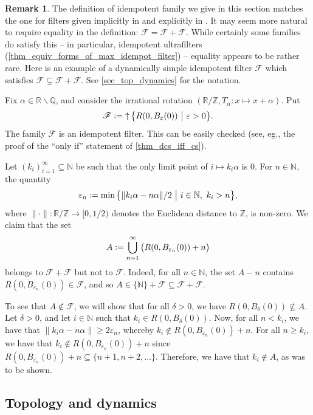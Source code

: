 \documentclass[letter,11pt]{article}
\theoremstyle{plain}
\theoremstyle{definition}
\newtheorem{remark}[theorem]{Remark}
\theoremstyle{plain}
\theoremstyle{plain}
\numberwithin{equation}{section}
\newcommand{\eps}{\epsilon}
\newcommand{\N}{\mathbb{N}}
\newcommand{\Z}{\mathbb{Z}}
\newcommand{\R}{\mathbb{R}}
\newcommand{\Q}{\mathbb{Q}}
\newcommand{\defeq}{\vcentcolon=}
\renewcommand{\epsilon}{\varepsilon}
\renewcommand{\geq}{\geqslant}
\renewcommand{\setminus}{\backslash}
\DeclareMathOperator{\upclose}{\uparrow}
\newcommand{\filter}{\mathscr{F}}
\begin{document}
\begin{remark}
\label{rmk_why_set_inclusion_not_equality}
    The definition of idempotent family we give in this section matches the one for filters given implicitly in \cite{papazyan_1989} and explicitly in \cite{Krautzberger_2009}.  It may seem more natural to require equality in the definition: $\filter = \filter + \filter$.  While certainly some families do satisfy this -- in particular, idempotent ultrafilters (\cref{thm_equiv_forms_of_max_idempot_filter}) -- equality appears to be rather rare.  Here is an example of a dynamically simple idempotent filter $\filter$ which satisfies $\filter \subsetneq \filter + \filter$.  See \cref{sec_top_dynamics} for the notation.
    
    Fix $\alpha \in \R \setminus \Q$, and consider the irrational rotation $(\R / \Z, T_{\alpha}: x \mapsto x + \alpha)$.  Put
    \[\filter \defeq \upclose \big\{ R(0, B_\eps(0)) \ \big| \ \eps > 0\big\}.\]
    The family $\filter$ is an idempotent filter.  This can be easily checked (see, eg., the proof of the ``only if'' statement of \cref{thm_dcs_iff_cs}).

    Let $(k_i)_{i=1}^\infty \subseteq \N$ be such that the only limit point of $i \mapsto k_i \alpha$ is $0$. For $n \in \N$, the quantity
    \[\eps_n \defeq \min \big\{ \|k_i \alpha - n \alpha \|/2 \ \big| \ i \in \N, \ k_i > n \big\},\]
    where $\| \cdot \|: \R / \Z \to [0,1/2)$ denotes the Euclidean distance to $\Z$, is non-zero.
    We claim that the set
    \[A \defeq \bigcup_{n = 1}^\infty \big( R(0, B_{\eps_n}(0) ) + n \big)\]
    belongs to $\filter + \filter$ but not to $\filter$.  Indeed, for all $n \in \N$, the set $A - n$ contains $R(0, B_{\eps_n}(0) ) \in \filter$, and so $A \in \{\N\} + \filter \subseteq \filter + \filter$.

    To see that $A \not\in \filter$, we will show that for all $\delta > 0$, we have $R(0,B_{\delta}(0)) \not\subseteq A$.  Let $\delta > 0$, and let $i \in \N$ such that $k_i \in R(0,B_{\delta}(0))$.  Now, for all $n < k_i$, we have that $\|k_i \alpha - n \alpha\| \geq 2\eps_n$, whereby $k_i \notin R(0,B_{\eps_n}(0)) + n$.  For all $n \geq k_i$, we have that $k_i \notin R(0,B_{\eps_n}(0)) + n$ since $R(0,B_{\eps_n}(0)) + n \subseteq \{n+1, n+2, \ldots\}$.  Therefore, we have that $k_i \not\in A$, as was to be shown.
\end{remark}


\subsection{Topology and dynamics}
\end{document}
